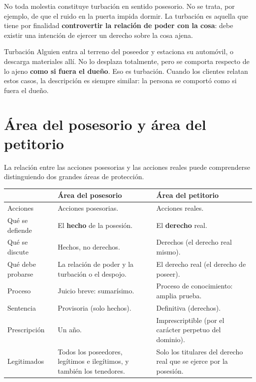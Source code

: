 \documentclass[12pt,oneside]{book}
\begin{document}
No toda molestia constituye turbación en sentido posesorio. No se trata, por ejemplo, de que el ruido en la puerta impida dormir. La turbación es aquella que tiene por finalidad \textbf{controvertir la relación de poder con la cosa}: debe existir una intención de ejercer un derecho sobre la cosa ajena.

\begin{example}{Turbación}
Alguien entra al terreno del poseedor y estaciona su automóvil, o descarga materiales allí. No lo desplaza totalmente, pero se comporta respecto de lo ajeno \textbf{como si fuera el dueño}. Eso es turbación. Cuando los clientes relatan estos casos, la descripción es siempre similar: la persona se comportó como si fuera el dueño.
\end{example}

\section{Área del posesorio y área del petitorio}

La relación entre las acciones posesorias y las acciones reales puede comprenderse distinguiendo dos grandes áreas de protección.

\begin{table}[H]
\centering
\begin{tabularx}{\textwidth}{@{}>{\raggedright\arraybackslash}p{}>{\raggedright\arraybackslash}X>{\raggedright\arraybackslash}X@{}}
\toprule
 & \textbf{Área del posesorio} & \textbf{Área del petitorio} \\
\midrule
Acciones & Acciones posesorias. & Acciones reales. \\
Qué se defiende & El \textbf{hecho} de la posesión. & El \textbf{derecho} real. \\
Qué se discute & Hechos, no derechos. & Derechos (el derecho real mismo). \\
Qué debe probarse & La relación de poder y la turbación o el despojo. & El derecho real (el derecho de poseer). \\
Proceso & Juicio breve: sumarísimo. & Proceso de conocimiento: amplia prueba. \\
Sentencia & Provisoria (solo hechos). & Definitiva (derechos). \\
Prescripción & Un año. & Imprescriptible (por el carácter perpetuo del dominio). \\
Legitimados & Todos los poseedores, legítimos e ilegítimos, y también los tenedores. & Solo los titulares del derecho real que se ejerce por la posesión. \\
\bottomrule
\end{tabularx}
\end{table}
\end{document}
